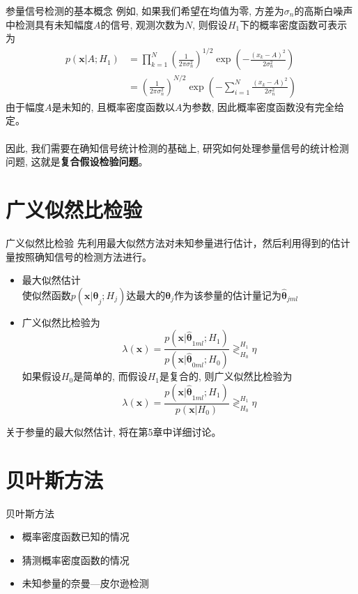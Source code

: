 \begin{frame}[shrink]{参量信号检测的基本概念}
例如, 如果我们希望在均值为零, 方差为$\sigma_n$的高斯白噪声中检测具有未知幅度$A$的信号, 观测次数为$N$, 则假设$H_1$下的概率密度函数可表示为
\begin{align*}
 p(\bm{x}|A;H_1)&=\prod_{k=1}^{N}\left(\frac{1}{2\pi\sigma_n^2}\right)^{1/2}\exp\left(-\frac{(x_k-A)^2}{2\sigma_n^2}\right)\\
 &=\left(\frac{1}{2\pi\sigma_n^2}\right)^{N/2}\exp\left(-\sum_{i=1}^{N}\frac{(x_k-A)^2}{2\sigma_n^2}\right)
\end{align*}
由于幅度$A$是未知的, 且概率密度函数以$A$为参数, 因此概率密度函数没有完全给定。\\
~\\
因此, 我们需要在确知信号统计检测的基础上, 研究如何处理参量信号的统计检测问题, 这就是\textbf{复合假设检验问题}。
\end{frame}

\section{广义似然比检验}

\begin{frame}[shrink]{广义似然比检验}
先利用最大似然方法对未知参量进行估计，然后利用得到的估计量按照确知信号的检测方法进行。
\begin{itemize}
	\setlength{\itemsep}{.2cm}
	\item 最大似然估计\\
	使似然函数$p(\bm{x|\theta}_j; H_j)$达最大的$\bm{\theta}_j$作为该参量的估计量记为$\bm{\hat{\theta}}_{jml}$
	\item 广义似然比检验为
	\[\lambda(\bm{x})=\frac{p(\bm{x|\hat{\theta}}_{1ml}; H_1)}{p(\bm{x|\hat{\theta}}_{0ml}; H_0)}\mathop{\gtrless}_{H_0}^{H_1}\eta \]
	如果假设$H_0$是简单的, 而假设$H_1$是复合的, 则广义似然比检验为
	\[\lambda(\bm{x})=\frac{p(\bm{x|\hat{\theta}}_{1ml}; H_1)}{p(\bm{x}|H_0)}\mathop{\gtrless}_{H_0}^{H_1}\eta \]
\end{itemize}
关于参量的最大似然估计, 将在第5章中详细讨论。
\end{frame}

\section{贝叶斯方法}

\begin{frame}{贝叶斯方法}
\begin{itemize}
	\setlength{\itemsep}{.5cm}
	\item 概率密度函数已知的情况
	\item 猜测概率密度函数的情况
	\item 未知参量的奈曼---皮尔逊检测	
\end{itemize}
\end{frame}

